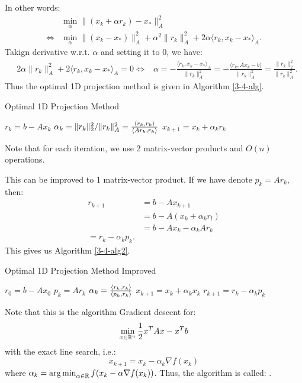 \documentclass[../main/main.tex]{subfiles}
\begin{document}
In other words:
\begin{align*}
 & \min _{\alpha } \|(x_{k}+\alpha r_{k})-x_{*}\|_{A}^2\\
 \iff & \min _{\alpha }\|(x_{k}-x_{*})\|^2_{A}+ \alpha ^2 \|r_{k}\|_{A}^2 + 2\alpha \langle r_{k}, x_{k}-x_{*}\rangle_{A}
  .\end{align*}
Takign derivative w.r.t. $\alpha $ and setting it to 0, we have:
\begin{align*}
&  2\alpha \|r_{k}\|_{A}^2 + 2\langle r_{k}, x_{k}-x_{*}\rangle_{A}=0
                 \iff & \alpha = - \frac{\langle r_{k}, x_{k}- x_{*}\rangle_{A}}{\|r_{k}\|_{A}^2} =  - \frac{\langle r_{k}, Ax_{k}- b\rangle}{\|r_{k}\|_{A}^2}  = \frac{\|r_{k}\|_{2}^2}{\|r_{k}\|_{A}^2}
  .\end{align*}
Thus the optimal 1D projection method is given in Algorithm \ref{3-4-alg}.
        \begin{algorithm}[h!]
	\caption{Optimal 1D Projection Method}
    \label{3-4-alg}
	\begin{algorithmic}[1]
 \State $r_{k}=b-Ax_{k}$
 \State $\alpha _{k} = \|r_{k}\|^2_{2} / \|r_{k}\|_{A}^2 = \frac{\left\langle{r_{k}},{r_{k}}\right\rangle}{\left\langle{Ar_{k}},{r_{k}}\right\rangle} $
 \State $x_{k+1} = x_{k}+\alpha _{k}r_{k}$
      \EndFor
	\end{algorithmic}
	\end{algorithm}
  \begin{remark}
Note that for each iteration, we use 2 matrix-vector products and $O(n)$ operations.
  \end{remark}
  This can be improved to 1 matrix-vector product. If we have denote $p_{k} = Ar_{k}$, then:
  \begin{align*}
    r_{k+1} &= b - Ax_{k+1} \\
            &= b-A(x_{k}+\alpha_{k}r_{l}) \\
            &= b-Ax_{k}-\alpha _{k}Ar_{k}\\
    = r_{k} - \alpha _{k} p_{k}
    .\end{align*}
  This gives us Algorithm \ref{3-4-alg2}.
        \begin{algorithm}[h!]
	\caption{Optimal 1D Projection Method Improved}
    \label{3-4-alg2}
	\begin{algorithmic}[1]
      \State $r_{0}=b-Ax_{0}$
      \State $p_{k} = Ar_{k}$
 \State $\alpha _{k} = \frac{\left\langle{r_{k}},{r_{k}}\right\rangle}{\left\langle{p_{k}},{r_{k}}\right\rangle} $
 \State $x_{k+1} = x_{k}+\alpha _{k}x_{k}$
 \State $r_{k+1} = r_{k}- \alpha _{k}p_{k}$
      \EndFor
	\end{algorithmic}
	\end{algorithm}
    Note that this is the algorithm Gradient descent for: \[
\min_{x\in \mathbb{R} ^{n}} \frac{1}{2} x^{T}Ax-x^{T}b
\] with the exact line search, i.e.: \[
x_{k+1} = x_{k} -\alpha _{k}\nabla f(x_{k})
\] where $\alpha _{k} = \operatorname*{arg\,min}_{\alpha  \in \mathbb{R} } f(x_{k}-\alpha \nabla f(x_{k}))$. Thus, the algorithm is called: .
\end{document}
